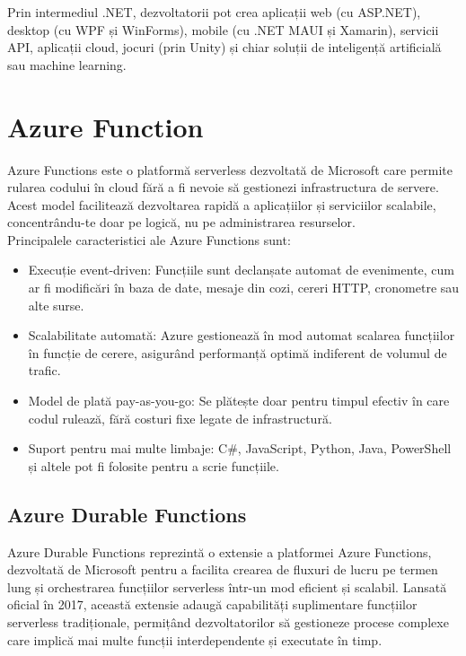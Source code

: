Prin intermediul .NET, dezvoltatorii pot crea aplicații web (cu ASP.NET), desktop (cu WPF și WinForms), mobile (cu .NET MAUI și Xamarin), servicii API, aplicații cloud, jocuri (prin Unity) și chiar soluții de inteligență artificială sau machine learning. \parencite{dotnet}

\section{Azure Function}
Azure Functions este o platformă serverless dezvoltată de Microsoft care permite rularea codului în cloud fără a fi nevoie să gestionezi infrastructura de servere. Acest model facilitează dezvoltarea rapidă a aplicațiilor și serviciilor scalabile, concentrându-te doar pe logică, nu pe administrarea resurselor. \parencite{azureFunctions}
\\Principalele caracteristici ale Azure Functions sunt:
\begin{itemize}
    \item Execuție event-driven: Funcțiile sunt declanșate automat de evenimente, cum ar fi modificări în baza de date, mesaje din cozi, cereri HTTP, cronometre sau alte surse.
    \item Scalabilitate automată: Azure gestionează în mod automat scalarea funcțiilor în funcție de cerere, asigurând performanță optimă indiferent de volumul de trafic.
    \item Model de plată pay-as-you-go: Se plătește doar pentru timpul efectiv în care codul rulează, fără costuri fixe legate de infrastructură.
    \item Suport pentru mai multe limbaje: C\#, JavaScript, Python, Java, PowerShell și altele pot fi folosite pentru a scrie funcțiile.
\end{itemize}\parencite{azureFunctions}

\subsection{Azure Durable Functions}
Azure Durable Functions reprezintă o extensie a platformei Azure Functions, dezvoltată de Microsoft pentru a facilita crearea de fluxuri de lucru pe termen lung și orchestrarea funcțiilor serverless într-un mod eficient și scalabil. Lansată oficial în 2017, această extensie adaugă capabilități suplimentare funcțiilor serverless tradiționale, permițând dezvoltatorilor să gestioneze procese complexe care implică mai multe funcții interdependente și executate în timp. \parencite{azureDurableFunctions}

